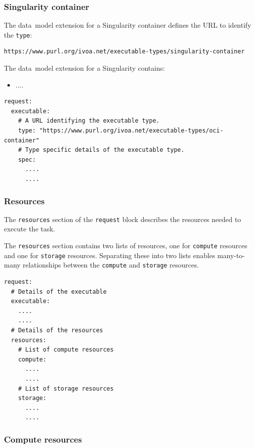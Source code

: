\documentclass[11pt,a4paper]{ivoa}
\newcommand{\datamodel} {data~model}
\newcommand{\singularity} {Singularity}
\newcommand{\codeword}[1] {\texttt{#1}}
\begin{document}
\subsubsection{Singularity container}
\label{subsub-datamodel-singularity-container}

The \datamodel{} extension for a \singularity{} container defines the URL
to identify the \codeword{type}:
\begin{lstlisting}[]
https://www.purl.org/ivoa.net/executable-types/singularity-container
\end{lstlisting}
\hfill \break
The \datamodel{} extension for a \singularity{} contains:
\begin{itemize}
    \item ....
\end{itemize}

\begin{lstlisting}[]
request:
  executable:
    # A URL identifying the executable type.
    type: "https://www.purl.org/ivoa.net/executable-types/oci-container"
    # Type specific details of the executable type.
    spec:
      ....
      ....
\end{lstlisting}

\subsubsection{Resources}
\label{subsub-datamodel-resources}

The \codeword{resources} section of the \codeword{request} block describes the resources needed
to execute the task.

The \codeword{resources} section contains two lists of resources, one for
\codeword{compute} resources and one for \codeword{storage} resources.
Separating these into two lists enables many-to-many relationships between the \codeword{compute}
and \codeword{storage} resources.

\begin{lstlisting}[]
request:
  # Details of the executable
  executable:
    ....
    ....
  # Details of the resources
  resources:
    # List of compute resources
    compute:
      ....
      ....
    # List of storage resources
    storage:
      ....
      ....
\end{lstlisting}

\subsubsection{Compute resources}
\label{subsub-datamodel-compute-resources}
\end{document}
